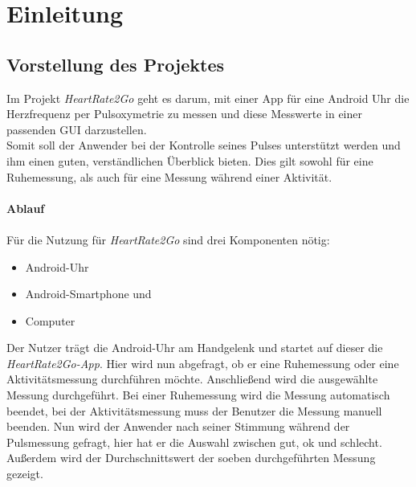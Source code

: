 \newpage
\section{Einleitung} \label{sec:Einleitung}
\subsection{Vorstellung des Projektes} \label{sec:Vorstellung des Projektes}
Im Projekt \textit{HeartRate2Go} geht es darum, mit einer App für eine Android Uhr die Herzfrequenz per Pulsoxymetrie zu messen und diese Messwerte in einer passenden GUI darzustellen. \\
Somit soll der Anwender bei der Kontrolle seines Pulses unterstützt werden und ihm einen guten, verständlichen Überblick bieten. Dies gilt sowohl für eine Ruhemessung, als auch für eine Messung während einer Aktivität. \\
\\
\textbf{Ablauf}\\
\\
Für die Nutzung für \textit{HeartRate2Go} sind drei Komponenten nötig:\\
\begin{itemize}
	\item Android-Uhr
	\item Android-Smartphone und
	\item Computer
\end{itemize}
Der Nutzer trägt die Android-Uhr am Handgelenk und startet auf dieser die \textit{HeartRate2Go-App}. Hier wird nun abgefragt, ob er eine Ruhemessung oder eine Aktivitätsmessung durchführen möchte. Anschließend wird die ausgewählte Messung durchgeführt. Bei einer Ruhemessung wird die Messung automatisch beendet, bei der Aktivitätsmessung muss der Benutzer die Messung manuell beenden. 
Nun wird der Anwender nach seiner Stimmung während der Pulsmessung gefragt, hier hat er die Auswahl zwischen gut, ok und schlecht. Außerdem wird der Durchschnittswert der soeben durchgeführten Messung gezeigt.\\
